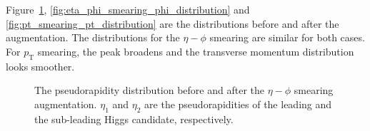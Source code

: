 \documentclass[12pt]{article}
\begin{document}
		Figure~\ref{fig:eta_phi_smearing_eta_distribution}, \ref{fig:eta_phi_smearing_phi_distribution} and \ref{fig:pt_smearing_pt_distribution} are the distributions before and after the augmentation. The distributions for the $\eta-\phi$ smearing are similar for both cases. For $p_\text{T}$ smearing, the peak broadens and the transverse momentum distribution looks smoother.
		\begin{figure}[htpb]
			\centering
			\caption{The pseudorapidity distribution before and after the $\eta-\phi$ smearing augmentation. $\eta_1$ and $\eta_2$ are the pseudorapidities of the leading and the sub-leading Higgs candidate, respectively.}
			\label{fig:eta_phi_smearing_eta_distribution}
		\end{figure}
\end{document}
